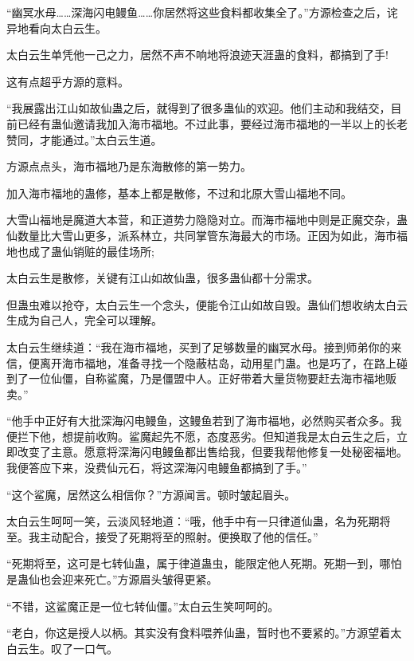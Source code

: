 
\begin{this_body}



“幽冥水母……深海闪电鳗鱼……你居然将这些食料都收集全了。”方源检查之后，诧异地看向太白云生。

太白云生单凭他一己之力，居然不声不响地将浪迹天涯蛊的食料，都搞到了手!

这有点超乎方源的意料。

“我展露出江山如故仙蛊之后，就得到了很多蛊仙的欢迎。他们主动和我结交，目前已经有蛊仙邀请我加入海市福地。不过此事，要经过海市福地的一半以上的长老赞同，才能通过。”太白云生道。

方源点点头，海市福地乃是东海散修的第一势力。

加入海市福地的蛊修，基本上都是散修，不过和北原大雪山福地不同。

大雪山福地是魔道大本营，和正道势力隐隐对立。而海市福地中则是正魔交杂，蛊仙数量比大雪山更多，派系林立，共同掌管东海最大的市场。正因为如此，海市福地也成了蛊仙销赃的最佳场所;

太白云生是散修，关键有江山如故仙蛊，很多蛊仙都十分需求。

但蛊虫难以抢夺，太白云生一个念头，便能令江山如故自毁。蛊仙们想收纳太白云生成为自己人，完全可以理解。

太白云生继续道：“我在海市福地，买到了足够数量的幽冥水母。接到师弟你的来信，便离开海市福地，准备寻找一个隐蔽枯岛，动用星门蛊。也是巧了，在路上碰到了一位仙僵，自称鲨魔，乃是僵盟中人。正好带着大量货物要赶去海市福地贩卖。”

“他手中正好有大批深海闪电鳗鱼，这鳗鱼若到了海市福地，必然购买者众多。我便拦下他，想提前收购。鲨魔起先不愿，态度恶劣。但知道我是太白云生之后，立即改变了主意。愿意将深海闪电鳗鱼都出售给我，但要我帮他修复一处秘密福地。我便答应下来，没费仙元石，将这深海闪电鳗鱼都搞到了手。”

“这个鲨魔，居然这么相信你？”方源闻言。顿时皱起眉头。

太白云生呵呵一笑，云淡风轻地道：“哦，他手中有一只律道仙蛊，名为死期将至。我主动配合，接受了死期将至的照射。便换取了他的信任。”

“死期将至，这可是七转仙蛊，属于律道蛊虫，能限定他人死期。死期一到，哪怕是蛊仙也会迎来死亡。”方源眉头皱得更紧。

“不错，这鲨魔正是一位七转仙僵。”太白云生笑呵呵的。

“老白，你这是授人以柄。其实没有食料喂养仙蛊，暂时也不要紧的。”方源望着太白云生。叹了一口气。


\end{this_body}

